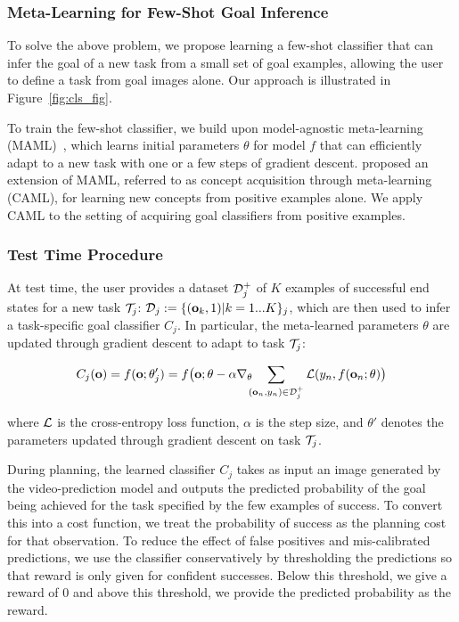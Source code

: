 \subsubsection{Meta-Learning for Few-Shot Goal Inference}

To solve the above problem, we propose learning a few-shot classifier that can infer the goal of a new task from a small set of goal examples, allowing the user to define a task from goal images alone. Our approach is illustrated in Figure~\ref{fig:cls_fig}.

To train the few-shot classifier, we build upon model-agnostic meta-learning (MAML)~\cite{maml}, which learns initial parameters $\theta$ for model $f$ that can efficiently adapt to a new task with one or a few steps of gradient descent. \cite{caml} proposed an extension of MAML, referred to as concept acquisition through meta-learning (CAML), for learning new concepts from positive examples alone. We apply CAML to the setting of acquiring goal classifiers from positive examples.

\subsubsection{Test Time Procedure}

At test time, the user provides a dataset $\mathcal{D}^+_j$ of $K$ examples of successful end states for a new task $\mathcal{T}_j$: $\mathcal{D}_j:=\{(\mathbf{o}_k, 1) | k = 1...K\}_j$, which are then used to infer a task-specific goal classifier $C_j$. In particular, the meta-learned parameters $\theta$ are updated through gradient descent to adapt to task $\mathcal{T}_j$:

$$
C_j(\mathbf{o})
= f(\mathbf{o}; \theta_j')
= f\big(\mathbf{o}; \theta-\alpha \nabla_\theta \!\!\! \sum_{(\mathbf{o}_n, y_n)\in \mathcal{D}^+_j} \mathcal{L} (y_n, f(\mathbf{o}_n; \theta)\big)
$$

where $\mathcal{L}$ is the cross-entropy loss function, $\alpha$ is the step size, and $\theta'$ denotes the parameters updated through gradient descent on task $\mathcal{T}_j$.

During planning, the learned classifier $C_j$ takes as input an image generated by the video-prediction model and outputs the predicted probability of the goal being achieved for the task specified by the few examples of success. To convert this into a cost function, we treat the probability of success as the planning cost for that observation. To reduce the effect of false positives and mis-calibrated predictions, we use the classifier conservatively by thresholding the predictions so that reward is only given for confident successes. Below this threshold, we give a reward of 0 and above this threshold, we provide the predicted probability as the reward. %


